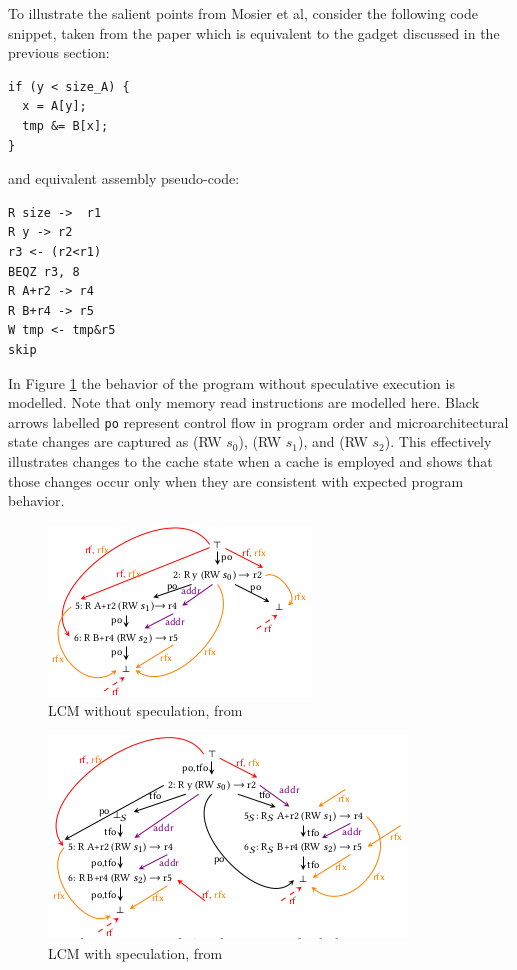 \documentclass[11pt,conference]{IEEEtran}
\begin{document}
To illustrate the salient points from Mosier et al, consider the following code snippet, taken from the paper which is equivalent to the gadget discussed in the previous section:
\begin{lstlisting}
if (y < size_A) {
  x = A[y];
  tmp &= B[x];
}
\end{lstlisting}
and equivalent assembly pseudo-code:
\begin{lstlisting}
R size ->  r1
R y -> r2
r3 <- (r2<r1)
BEQZ r3, 8
R A+r2 -> r4
R B+r4 -> r5
W tmp <- tmp&r5
skip
\end{lstlisting}

In Figure \ref{fig:lcm1} the behavior of the program without speculative execution is modelled.
Note that only memory read instructions are modelled here.
Black arrows labelled \texttt{po} represent control flow in program order and microarchitectural state changes are captured as (RW $s_0$), (RW $s_1$), and (RW $s_2$).
This effectively illustrates changes to the cache state when a cache is employed and shows that those changes occur only when they are consistent with expected program behavior.

\begin{figure}[t]
  \centering
  \includegraphics[width=0.6\linewidth]{lcm1}
	\caption{LCM without speculation, from \cite{mosier2022}}
  \label{fig:lcm1}
\end{figure}
\begin{figure}[t]
  \includegraphics[width=0.8\linewidth]{lcm2}
	\caption{LCM with speculation, from \cite{mosier2022}}
  \label{fig:lcm2}
\end{figure}
\end{document}
